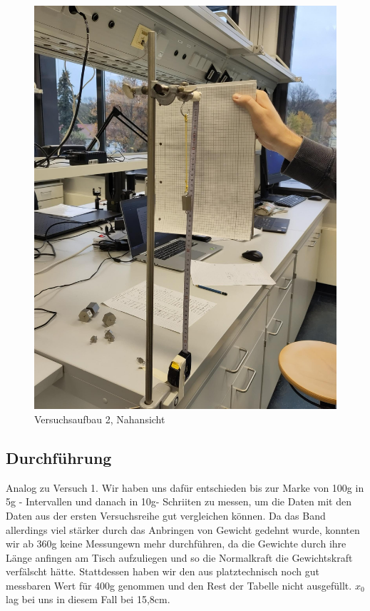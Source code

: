 \documentclass[
  9pt,
]{article}
\begin{document}
\begin{figure}
\centering
\includegraphics{Bilder/V2B2.jpeg}
\caption{Versuchsaufbau 2, Nahansicht}
\end{figure}

\hypertarget{durchfuxfchrung-1}{%
\subsection{Durchführung}\label{durchfuxfchrung-1}}

Analog zu Versuch 1. Wir haben uns dafür entschieden bis zur Marke von
100g in 5g - Intervallen und danach in 10g- Schriiten zu messen, um die
Daten mit den Daten aus der ersten Versuchsreihe gut vergleichen können.
Da das Band allerdings viel stärker durch das Anbringen von Gewicht
gedehnt wurde, konnten wir ab 360g keine Messungewn mehr durchführen, da
die Gewichte durch ihre Länge anfingen am Tisch aufzuliegen und so die
Normalkraft die Gewichtskraft verfälscht hätte. Stattdessen haben wir
den aus platztechnisch noch gut messbaren Wert für 400g genommen und den
Rest der Tabelle nicht ausgefüllt. \(x_0\) lag bei uns in diesem Fall
bei 15,8cm.
\end{document}
